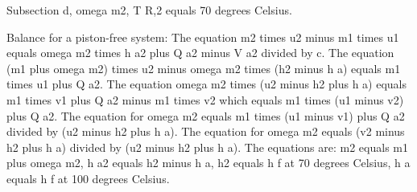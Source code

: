 Subsection d, omega m2, T R,2 equals 70 degrees Celsius.

Balance for a piston-free system:
The equation m2 times u2 minus m1 times u1 equals omega m2 times h a2 plus Q a2 minus V a2 divided by c.
The equation (m1 plus omega m2) times u2 minus omega m2 times (h2 minus h a) equals m1 times u1 plus Q a2.
The equation omega m2 times (u2 minus h2 plus h a) equals m1 times v1 plus Q a2 minus m1 times v2 which equals m1 times (u1 minus v2) plus Q a2.
The equation for omega m2 equals m1 times (u1 minus v1) plus Q a2 divided by (u2 minus h2 plus h a).
The equation for omega m2 equals (v2 minus h2 plus h a) divided by (u2 minus h2 plus h a).
The equations are:
m2 equals m1 plus omega m2,
h a2 equals h2 minus h a,
h2 equals h f at 70 degrees Celsius,
h a equals h f at 100 degrees Celsius.